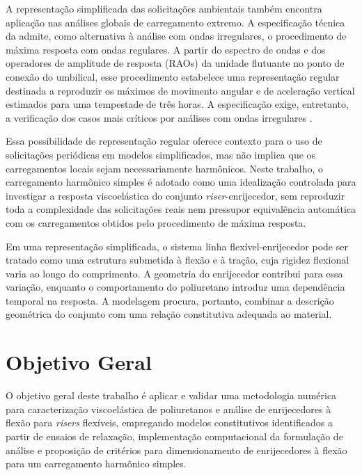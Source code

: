 \documentclass[arial,centeredequations,english,brazilian,oneside,section=TITLE]{ifes8}
\begin{document}

A representação simplificada das solicitações ambientais também encontra aplicação nas análises globais de carregamento
extremo. A especificação técnica da  admite, como alternativa à análise
com ondas irregulares, o procedimento de máxima resposta com ondas regulares. A partir do espectro de ondas e dos
operadores de amplitude de resposta (RAOs) da unidade flutuante no ponto de conexão do umbilical, esse procedimento
estabelece uma representação regular destinada a reproduzir os máximos de movimento angular e de aceleração vertical
estimados para uma tempestade de três horas. A especificação exige, entretanto, a verificação dos casos mais críticos
por análises com ondas irregulares \cite{Petrobras2024}.

Essa possibilidade de representação regular oferece contexto para o uso de solicitações periódicas em modelos
simplificados, mas não implica que os carregamentos locais sejam necessariamente harmônicos. Neste trabalho, o
carregamento harmônico simples é adotado como uma idealização controlada para investigar a resposta viscoelástica do
conjunto \emph{riser}-enrijecedor, sem reproduzir toda a complexidade das solicitações reais nem pressupor equivalência
automática com os carregamentos obtidos pelo procedimento de máxima resposta.

Em uma representação simplificada, o sistema linha flexível-enrijecedor pode ser tratado como uma estrutura submetida à 
flexão e à tração, cuja rigidez flexional varia ao longo do comprimento. A geometria do enrijecedor contribui para essa 
variação, enquanto o comportamento do poliuretano introduz uma dependência temporal na resposta. A modelagem procura, 
portanto, combinar a descrição geométrica do conjunto com uma relação constitutiva adequada ao material.


\section{Objetivo Geral}
\label{sec:objetivo-geral}

O objetivo geral deste trabalho é aplicar e validar uma metodologia numérica
para caracterização viscoelástica de poliuretanos e análise de enrijecedores à
flexão para \emph{risers} flexíveis, empregando modelos constitutivos identificados a 
partir de ensaios de relaxação, implementação computacional da formulação de análise e 
proposição de critérios para dimensionamento de  enrijecedores à flexão para um 
carregamento harmônico simples.
\end{document}

